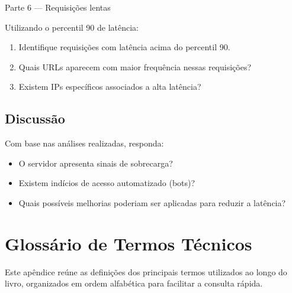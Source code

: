 \documentclass[12pt,a4paper,twoside]{report}
\begin{document}
\begin{block}{Parte 6 — Requisições lentas}

Utilizando o percentil 90 de latência:

\begin{enumerate}
\item Identifique requisições com latência acima do percentil 90.
\item Quais URLs aparecem com maior frequência nessas requisições?
\item Existem IPs específicos associados a alta latência?
\end{enumerate}

\vspace{1cm}

\end{block}

\section*{Discussão}

Com base nas análises realizadas, responda:

\begin{itemize}
\item O servidor apresenta sinais de sobrecarga?
\item Existem indícios de acesso automatizado (bots)?
\item Quais possíveis melhorias poderiam ser aplicadas para reduzir a latência?
\end{itemize}

\vspace{4cm}

\chapter{Glossário de Termos Técnicos}

Este apêndice reúne as definições dos principais termos utilizados ao longo do livro, organizados em ordem alfabética para facilitar a consulta rápida.
\end{document}
